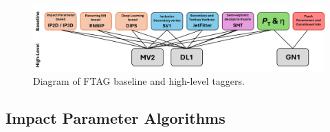 \begin{figure}[h]
    \centering
    \includegraphics[scale=0.5]{figs/ch4/ftag-diagram.png}
    \caption{ Diagram of FTAG baseline and high-level taggers.}
\label{fig:ftag-diagram}
\end{figure}

\subsection{Impact Parameter Algorithms}\label{sec:ip-algo}

